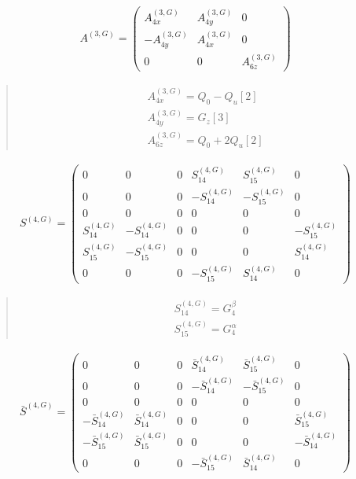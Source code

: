 \documentclass[fleqn,10pt]{jsarticle}
\begin{document}
\begin{align*}
A^{(3,G)} = \begin{pmatrix} A^{(3,G)}_{4x} & A^{(3,G)}_{4y} & 0 \\ - A^{(3,G)}_{4y} & A^{(3,G)}_{4x} & 0 \\ 0 & 0 & A^{(3,G)}_{6z} \end{pmatrix}
\end{align*}
\begin{quote}
\begin{align*}
& A^{(3,G)}_{4x} = Q_{0} - Q_{u}[2] \\
& A^{(3,G)}_{4y} = G_{z}[3] \\
& A^{(3,G)}_{6z} = Q_{0} + 2 Q_{u}[2]
\end{align*}
\end{quote}
\begin{align*}
S^{(4,G)} = \begin{pmatrix} 0 & 0 & 0 & S^{(4,G)}_{14} & S^{(4,G)}_{15} & 0 \\ 0 & 0 & 0 & - S^{(4,G)}_{14} & - S^{(4,G)}_{15} & 0 \\ 0 & 0 & 0 & 0 & 0 & 0 \\ S^{(4,G)}_{14} & - S^{(4,G)}_{14} & 0 & 0 & 0 & - S^{(4,G)}_{15} \\ S^{(4,G)}_{15} & - S^{(4,G)}_{15} & 0 & 0 & 0 & S^{(4,G)}_{14} \\ 0 & 0 & 0 & - S^{(4,G)}_{15} & S^{(4,G)}_{14} & 0 \end{pmatrix}
\end{align*}
\begin{quote}
\begin{align*}
& S^{(4,G)}_{14} = G_{4}^{\beta} \\
& S^{(4,G)}_{15} = G_{4}^{\alpha}
\end{align*}
\end{quote}
\begin{align*}
\bar{S}^{(4,G)} = \begin{pmatrix} 0 & 0 & 0 & \bar{S}^{(4,G)}_{14} & \bar{S}^{(4,G)}_{15} & 0 \\ 0 & 0 & 0 & - \bar{S}^{(4,G)}_{14} & - \bar{S}^{(4,G)}_{15} & 0 \\ 0 & 0 & 0 & 0 & 0 & 0 \\ - \bar{S}^{(4,G)}_{14} & \bar{S}^{(4,G)}_{14} & 0 & 0 & 0 & \bar{S}^{(4,G)}_{15} \\ - \bar{S}^{(4,G)}_{15} & \bar{S}^{(4,G)}_{15} & 0 & 0 & 0 & - \bar{S}^{(4,G)}_{14} \\ 0 & 0 & 0 & - \bar{S}^{(4,G)}_{15} & \bar{S}^{(4,G)}_{14} & 0 \end{pmatrix}
\end{align*}
\end{document}
